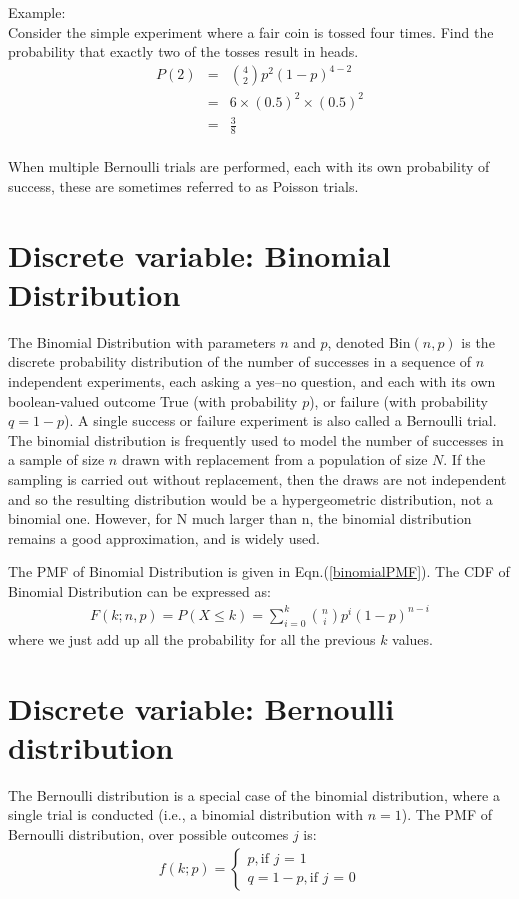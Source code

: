 Example:\\
Consider the simple experiment where a fair coin is tossed four times. Find the probability that exactly two of the tosses result in heads.\\
\begin{eqnarray*}
P(2) &=& \binom{4}{2}p^2 (1-p)^{4-2} \\ 
&=& 6 \times (0.5)^2 \times (0.5)^2 \\ 
&=& \frac{3}{8}\\ 
\label{coin}
\end{eqnarray*}

When multiple Bernoulli trials are performed, each with its own probability of success, these are sometimes referred to as Poisson trials.

\section{Discrete variable: Binomial Distribution}

The Binomial Distribution with parameters $n$ and $p$, denoted Bin$(n,p)$ is the discrete probability distribution of the number of successes in a sequence of $n$ independent experiments, each asking a yes–no question, and each with its own boolean-valued outcome True (with probability $p$), or failure (with probability $q = 1- p$). A single success or failure experiment is also called a Bernoulli trial. \\

The binomial distribution is frequently used to model the number of successes in a sample of size $n$ drawn with replacement from a population of size $N$. If the sampling is carried out without replacement, then the draws are not independent and so the resulting distribution would be a hypergeometric distribution, not a binomial one. However, for N much larger than n, the binomial distribution remains a good approximation, and is widely used.

The PMF of Binomial Distribution is given in Eqn.(\ref{binomialPMF}). The CDF of Binomial Distribution can be expressed as:
\begin{eqnarray}
F(k; n, p) = P (X \le k) = \sum_{i=0}^{k} \binom{n}{i} p^i (1-p)^{n-i}
\label{binomialCDF}
\end{eqnarray}
where we just add up all the probability for all the previous $k$ values.

\section{Discrete variable: Bernoulli distribution}
The Bernoulli distribution is a special case of the binomial distribution, where a single trial is conducted (i.e., a binomial distribution with $n = 1$). The PMF of Bernoulli distribution, over possible outcomes $j$ is:
\begin{eqnarray}
f(k;p) = \begin{cases}
p,             \text{if $j$ = 1}\\
q = 1-p,      \text{if $j$ = 0}
\end{cases}
\end{eqnarray}

